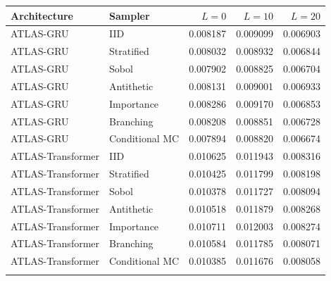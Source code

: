\begin{center}\begin{minipage}{\textwidth}\centering\small
\begin{tabular}{llrrr}
\toprule
Architecture & Sampler & $L=0$ & $L=10$ & $L=20$ \\\midrule
ATLAS-GRU & IID & 0.008187 & 0.009099 & 0.006903 \\
ATLAS-GRU & Stratified & 0.008032 & 0.008932 & 0.006844 \\
ATLAS-GRU & Sobol & 0.007902 & 0.008825 & 0.006704 \\
ATLAS-GRU & Antithetic & 0.008131 & 0.009001 & 0.006933 \\
ATLAS-GRU & Importance & 0.008286 & 0.009170 & 0.006853 \\
ATLAS-GRU & Branching & 0.008208 & 0.008851 & 0.006728 \\
ATLAS-GRU & Conditional MC & 0.007894 & 0.008820 & 0.006674 \\
\addlinespace
ATLAS-Transformer & IID & 0.010625 & 0.011943 & 0.008316 \\
ATLAS-Transformer & Stratified & 0.010425 & 0.011799 & 0.008198 \\
ATLAS-Transformer & Sobol & 0.010378 & 0.011727 & 0.008094 \\
ATLAS-Transformer & Antithetic & 0.010518 & 0.011879 & 0.008268 \\
ATLAS-Transformer & Importance & 0.010711 & 0.012003 & 0.008274 \\
ATLAS-Transformer & Branching & 0.010584 & 0.011785 & 0.008071 \\
ATLAS-Transformer & Conditional MC & 0.010385 & 0.011676 & 0.008058 \\
\addlinespace
\bottomrule\end{tabular}
\end{minipage}\end{center}